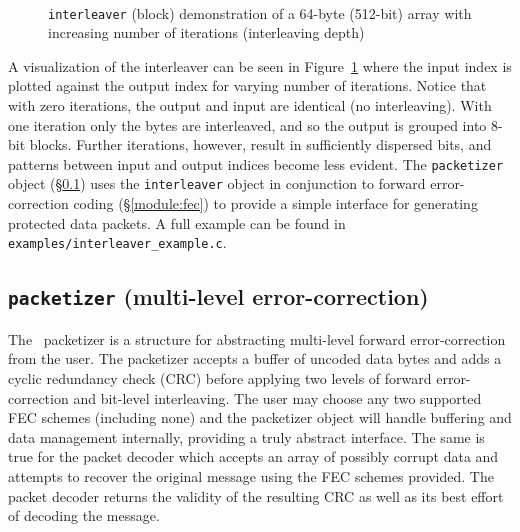 \begin{figure}
\centering
\mbox{
   \quad
   \quad
}
\mbox{
   \quad
   \quad
}
\mbox{
   \quad
}
\caption{{\tt interleaver} (block) demonstration of a 64-byte (512-bit) array
with increasing number of iterations (interleaving depth)}
\label{fig:module:framing:interleaver:scatterplot}
\end{figure}
%
A visualization of the interleaver can be seen in
Figure~\ref{fig:module:framing:interleaver:scatterplot}
where the input index is plotted against the output index for varying number
of iterations.
Notice that with zero iterations, the output and input are identical (no
interleaving).
With one iteration only the bytes are interleaved, and so the output is
grouped into 8-bit blocks.
Further iterations, however, result in sufficiently dispersed bits, and
patterns between input and output indices become less evident.
%
The {\tt packetizer} object (\S\ref{module:framing:packetizer}) uses the
{\tt interleaver} object in conjunction to forward error-correction coding
(\S\ref{module:fec}) to provide a simple interface for generating
protected data packets.
A full example can be found in {\tt examples/interleaver\_example.c}.


%
%
\subsection{{\tt packetizer} (multi-level error-correction)}
\label{module:framing:packetizer}
The \liquid\ packetizer is a structure for abstracting multi-level forward
error-correction from the user.
The packetizer accepts a buffer of uncoded data bytes and adds a
cyclic redundancy check (CRC) before applying two levels of forward
error-correction and bit-level interleaving.
The user may choose any two supported FEC schemes (including none) and the
packetizer object will handle buffering and data management internally,
providing a truly abstract interface.
The same is true for the packet decoder which accepts an array
of possibly corrupt data and attempts to recover the original message using
the FEC schemes provided.
The packet decoder returns the validity of the resulting CRC as well as its
best effort of decoding the message.

